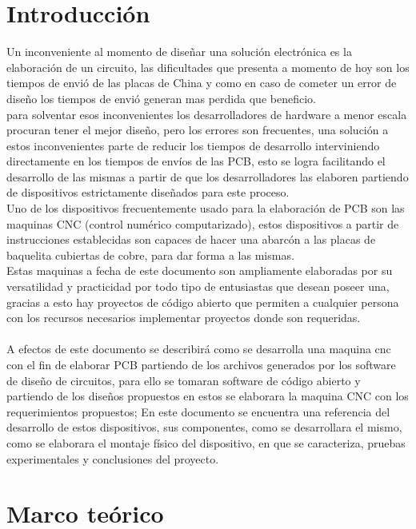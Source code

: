 \documentclass[conference]{IEEEtran}
\begin{document}
\section{Introducción}
Un inconveniente al momento de diseñar una solución electrónica es la elaboración de un circuito, las dificultades que presenta a momento de hoy son los tiempos de envió de las placas de China y como en caso de cometer un error de diseño los tiempos de envió generan mas perdida que beneficio.\\
para solventar esos inconvenientes los desarrolladores de hardware a menor escala procuran tener el mejor diseño, pero los errores son frecuentes, una solución a estos inconvenientes parte de reducir los tiempos de desarrollo interviniendo directamente en los tiempos de envíos de las PCB, esto se logra facilitando el desarrollo de las mismas a partir de que los desarrolladores las elaboren partiendo de dispositivos estrictamente diseñados para este proceso.\\
Uno de los dispositivos frecuentemente usado para la elaboración de PCB son las maquinas CNC (control numérico computarizado), estos dispositivos a partir de instrucciones establecidas son capaces de hacer una abarcón a las placas de baquelita cubiertas de cobre, para dar forma a las mismas.\\
Estas maquinas a fecha de este documento son ampliamente elaboradas por su versatilidad y practicidad por todo tipo de entusiastas que desean poseer una, gracias a esto hay proyectos de código abierto que permiten a cualquier persona con los recursos necesarios implementar proyectos donde son requeridas.\\
\\A efectos de este documento se describirá como se desarrolla una maquina cnc con el fin de elaborar PCB partiendo de los archivos generados por los software de diseño de circuitos, para ello se tomaran software de código abierto y partiendo de los diseños propuestos en estos se elaborara la maquina CNC con los requerimientos propuestos; En este documento se encuentra una referencia del desarrollo de estos dispositivos, sus componentes, como se desarrollara el mismo, como se elaborara el montaje físico del dispositivo, en que se caracteriza, pruebas experimentales y conclusiones del proyecto. 


\section{Marco teórico}
\end{document}
